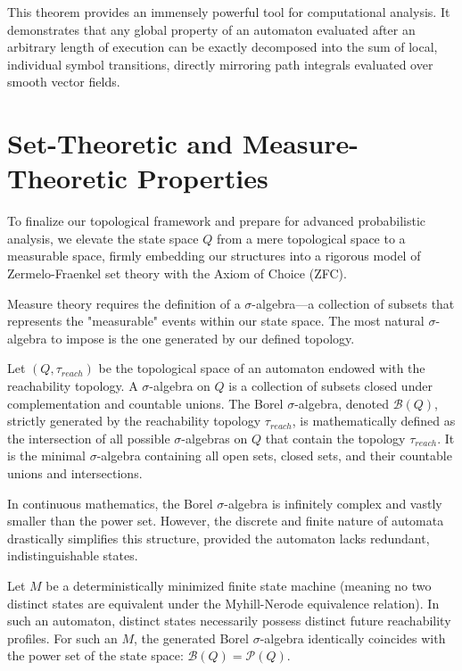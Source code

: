 This theorem provides an immensely powerful tool for computational analysis. It demonstrates that any global property of an automaton evaluated after an arbitrary length of execution can be exactly decomposed into the sum of local, individual symbol transitions, directly mirroring path integrals evaluated over smooth vector fields.

\section{Set-Theoretic and Measure-Theoretic Properties}

To finalize our topological framework and prepare for advanced probabilistic analysis, we elevate the state space $Q$ from a mere topological space to a measurable space, firmly embedding our structures into a rigorous model of Zermelo-Fraenkel set theory with the Axiom of Choice (ZFC). 

Measure theory requires the definition of a $\sigma$-algebra—a collection of subsets that represents the "measurable" events within our state space. The most natural $\sigma$-algebra to impose is the one generated by our defined topology.

\begin{definition}
\label{def:borel_automaton}
Let $(Q, \tau_{reach})$ be the topological space of an automaton endowed with the reachability topology. A $\sigma$-algebra on $Q$ is a collection of subsets closed under complementation and countable unions. The Borel $\sigma$-algebra, denoted $\mathcal{B}(Q)$, strictly generated by the reachability topology $\tau_{reach}$, is mathematically defined as the intersection of all possible $\sigma$-algebras on $Q$ that contain the topology $\tau_{reach}$. It is the minimal $\sigma$-algebra containing all open sets, closed sets, and their countable unions and intersections.
\end{definition}

In continuous mathematics, the Borel $\sigma$-algebra is infinitely complex and vastly smaller than the power set. However, the discrete and finite nature of automata drastically simplifies this structure, provided the automaton lacks redundant, indistinguishable states.

\begin{theorem}
\label{thm:borel_finite}
Let $M$ be a deterministically minimized finite state machine (meaning no two distinct states are equivalent under the Myhill-Nerode equivalence relation). In such an automaton, distinct states necessarily possess distinct future reachability profiles. For such an $M$, the generated Borel $\sigma$-algebra identically coincides with the power set of the state space: $\mathcal{B}(Q) = \mathcal{P}(Q)$.
\end{theorem}

